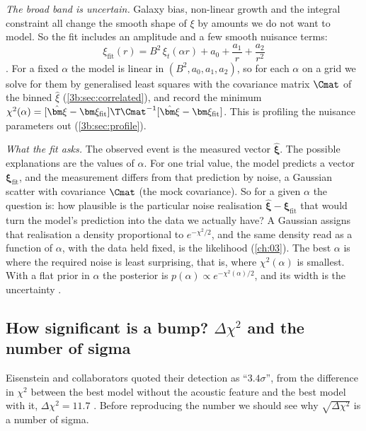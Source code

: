 \emph{The broad band is uncertain.} Galaxy bias, non-linear growth and the
integral constraint all change the smooth shape of $\xi$ by amounts we do not want
to model. So the fit includes an amplitude and a few smooth nuisance terms:
\begin{equation}
  \xi_{\mathrm{fit}}(r)=B^2\,\xi_t(\alpha r)+a_0+\frac{a_1}{r}+\frac{a_2}{r^2}
  \label{11a:eq:xi-fit}
\end{equation}
. For a fixed $\alpha$ the model is linear in
$(B^2,a_0,a_1,a_2)$, so for each $\alpha$ on a grid we solve for them by
generalised least squares with the covariance matrix $\Cmat$ of the binned
$\hat\xi$ (\cref{3b:sec:correlated}), and record the minimum
$\chi^2(\alpha)=[\hat{\bm\xi}-\bm\xi_{\mathrm{fit}}]\T\Cmat^{-1}[\hat{\bm\xi}-\bm\xi_{\mathrm{fit}}]$.
This is profiling the nuisance parameters out (\cref{3b:sec:profile}).

\emph{What the fit asks.} The observed event is the measured vector $\hat{\bm\xi}$.
The possible explanations are the values of $\alpha$. For one trial value, the
model predicts a vector $\bm\xi_{\mathrm{fit}}$, and the measurement differs from
that prediction by noise, a Gaussian scatter with covariance $\Cmat$ (the mock
covariance). So for a given $\alpha$ the question is: how plausible is the
particular noise realisation $\hat{\bm\xi}-\bm\xi_{\mathrm{fit}}$ that would turn
the model's prediction into the data we actually have? A Gaussian assigns that
realisation a density proportional to $e^{-\chi^2/2}$, and the same density read
as a function of $\alpha$, with the data held fixed, is the likelihood
(\cref{ch:03}). The best $\alpha$ is where the required noise is least
surprising, that is, where $\chi^2(\alpha)$ is smallest. With a flat prior in
$\alpha$ the posterior is $p(\alpha)\propto e^{-\chi^2(\alpha)/2}$, and its width
is the uncertainty .

\subsection{How significant is a bump? \texorpdfstring{$\Delta\chi^2$}{Delta chi2} and the number of sigma}
\label{11a:sec:bao-signif}

Eisenstein and collaborators quoted their detection as ``$3.4\sigma$'', from the
difference in $\chi^2$ between the best model without the acoustic feature and the
best model with it, $\Delta\chi^2=11.7$ . Before
reproducing the number we should see why $\sqrt{\Delta\chi^2}$ is a number of
sigma.

